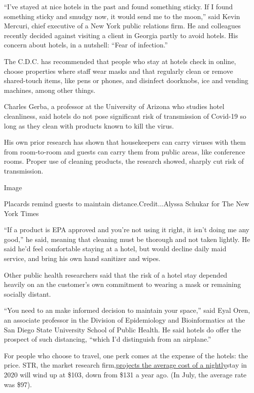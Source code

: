 ``I've stayed at nice hotels in the past and found something sticky. If
I found something sticky and smudgy now, it would send me to the moon,''
said Kevin Mercuri, chief executive of a New York public relations firm.
He and colleagues recently decided against visiting a client in Georgia
partly to avoid hotels. His concern about hotels, in a nutshell: ``Fear
of infection.''

The C.D.C. has recommended that people who stay at hotels check in
online, choose properties where staff wear masks and that regularly
clean or remove shared-touch items, like pens or phones, and disinfect
doorknobs, ice and vending machines, among other things.

Charles Gerba, a professor at the University of Arizona who studies
hotel cleanliness, said hotels do not pose significant risk of
transmission of Covid-19 so long as they clean with products known to
kill the virus.

His own prior research has shown that housekeepers can carry viruses
with them from room-to-room and guests can carry them from public areas,
like conference rooms. Proper use of cleaning products, the research
showed, sharply cut risk of transmission.

Image

Placards remind guests to maintain distance.Credit...Alyssa Schukar for
The New York Times

``If a product is EPA approved and you're not using it right, it isn't
doing me any good,'' he said, meaning that cleaning must be thorough and
not taken lightly. He said he'd feel comfortable staying at a hotel, but
would decline daily maid service, and bring his own hand sanitizer and
wipes.

Other public health researchers said that the risk of a hotel stay
depended heavily on an the customer's own commitment to wearing a mask
or remaining socially distant.

``You need to an make informed decision to maintain your space,'' said
Eyal Oren, an associate professor in the Division of Epidemiology and
Bioinformatics at the San Diego State University School of Public
Health. He said hotels do offer the prospect of such distancing, ``which
I'd distinguish from an airplane.''

For people who choose to travel, one perk comes at the expense of the
hotels: the price. STR, the market research
firm,\href{https://str.com/press-release/us-hotel-demand-not-expected-fully-recover-until-2023}{projects
the average cost of a nightly}stay in 2020 will wind up at \$103, down
from \$131 a year ago. (In July, the average rate was \$97).

